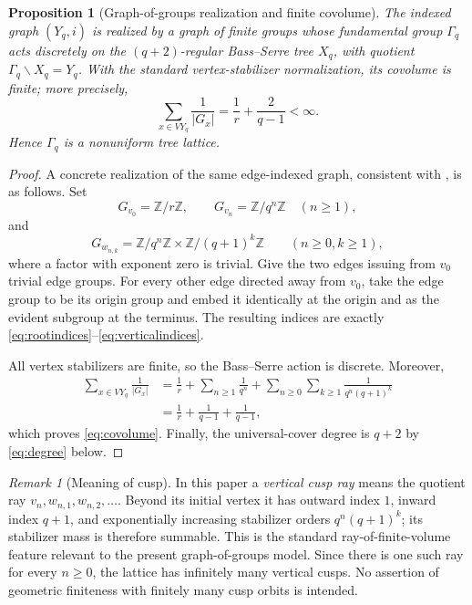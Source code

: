 \documentclass[11pt,reqno]{amsart}
\numberwithin{equation}{section}
\newtheorem{proposition}[theorem]{Proposition}
\theoremstyle{definition}
\theoremstyle{remark}
\newtheorem{remark}[theorem]{Remark}
\begin{document}
\begin{proposition}[Graph-of-groups realization and finite covolume]
\label{prop:lattice-realization}
The indexed graph $(Y_q,i)$ is realized by a graph of finite groups whose
fundamental group $\Gamma_q$ acts discretely on the $(q+2)$-regular
Bass--Serre tree $X_q$, with quotient $\Gamma_q\backslash X_q=Y_q$.  With the
standard vertex-stabilizer normalization, its covolume is finite; more
precisely,
\begin{equation}\label{eq:covolume}
 \sum_{x\in VY_q}\frac1{|G_x|}
 =\frac1r+\frac2{q-1}<\infty.
\end{equation}
Hence $\Gamma_q$ is a nonuniform tree lattice.
\end{proposition}

\begin{proof}
A concrete realization of the same edge-indexed graph, consistent with
\cite[pp.~305--306]{BroiseParkkonenPaulin2021}, is as follows.  Set
\[
 G_{v_0}=\mathbb Z/r\mathbb Z,\qquad
 G_{v_n}=\mathbb Z/q^n\mathbb Z\quad(n\ge1),
\]
and
\[
 G_{w_{n,k}}
 =\mathbb Z/q^n\mathbb Z\times
  \mathbb Z/(q+1)^k\mathbb Z
 \qquad(n\ge0, k\ge1),
\]
where a factor with exponent zero is trivial.  Give the two edges issuing
from $v_0$ trivial edge groups.  For every other edge directed away from
$v_0$, take the edge group to be its origin group and embed it identically at
the origin and as the evident subgroup at the terminus.  The resulting
indices are exactly \eqref{eq:rootindices}--\eqref{eq:verticalindices}.

All vertex stabilizers are finite, so the Bass--Serre action is discrete.
Moreover,
\begin{align*}
 \sum_{x\in VY_q}\frac1{|G_x|}
 &=\frac1r+\sum_{n\ge1}\frac1{q^n}
   +\sum_{n\ge0}\sum_{k\ge1}
     \frac1{q^n(q+1)^k}\\
 &=\frac1r+\frac1{q-1}+\frac1{q-1},
\end{align*}
which proves \eqref{eq:covolume}.  Finally, the universal-cover degree is
$q+2$ by \eqref{eq:degree} below.
\end{proof}

\begin{remark}[Meaning of cusp]
\label{rem:cusp-convention}
In this paper a \emph{vertical cusp ray} means the quotient ray
$v_n,w_{n,1},w_{n,2},\ldots$.  Beyond its initial vertex it has outward index
$1$, inward index $q+1$, and exponentially increasing stabilizer orders
$q^n(q+1)^k$; its stabilizer mass is therefore summable.  This is the standard
ray-of-finite-volume feature relevant to the present graph-of-groups model.
Since there is one such ray for every $n\ge0$, the lattice has infinitely many
vertical cusps.  No assertion of geometric finiteness with finitely many cusp
orbits is intended.
\end{remark}
\end{document}
